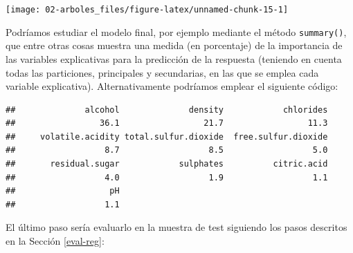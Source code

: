 \documentclass[
  spanish,
]{book}
\newenvironment{Shaded}{\begin{snugshade}}{\end{snugshade}}
\newcommand{\AttributeTok}[1]{\textcolor[rgb]{0.77,0.63,0.00}{#1}}
\newcommand{\CommentTok}[1]{\textcolor[rgb]{0.56,0.35,0.01}{\textit{#1}}}
\newcommand{\DecValTok}[1]{\textcolor[rgb]{0.00,0.00,0.81}{#1}}
\newcommand{\FunctionTok}[1]{\textcolor[rgb]{0.00,0.00,0.00}{#1}}
\newcommand{\NormalTok}[1]{#1}
\newcommand{\OtherTok}[1]{\textcolor[rgb]{0.56,0.35,0.01}{#1}}
\newcommand{\SpecialCharTok}[1]{\textcolor[rgb]{0.00,0.00,0.00}{#1}}
\newcommand{\StringTok}[1]{\textcolor[rgb]{0.31,0.60,0.02}{#1}}
\theoremstyle{break}
\theoremstyle{definition}
\theoremstyle{definition}
\theoremstyle{definition}
\theoremstyle{definition}
\theoremstyle{remark}
\begin{document}
\begin{center}\texttt{[image: 02-arboles\_files/figure-latex/unnamed-chunk-15-1]} \end{center}

Podríamos estudiar el modelo final, por ejemplo mediante el método \texttt{summary()}, que entre otras cosas muestra una medida (en porcentaje) de la importancia de las variables explicativas para la predicción de la respuesta (teniendo en cuenta todas las particiones, principales y secundarias, en las que se emplea cada variable explicativa).
Alternativamente podríamos emplear el siguiente código:

\begin{Shaded}
\end{Shaded}

\begin{verbatim}
##              alcohol              density            chlorides 
##                 36.1                 21.7                 11.3 
##     volatile.acidity total.sulfur.dioxide  free.sulfur.dioxide 
##                  8.7                  8.5                  5.0 
##       residual.sugar            sulphates          citric.acid 
##                  4.0                  1.9                  1.1 
##                   pH 
##                  1.1
\end{verbatim}

El último paso sería evaluarlo en la muestra de test siguiendo los pasos descritos en la Sección \ref{eval-reg}:

\begin{Shaded}
\end{Shaded}
\end{document}
